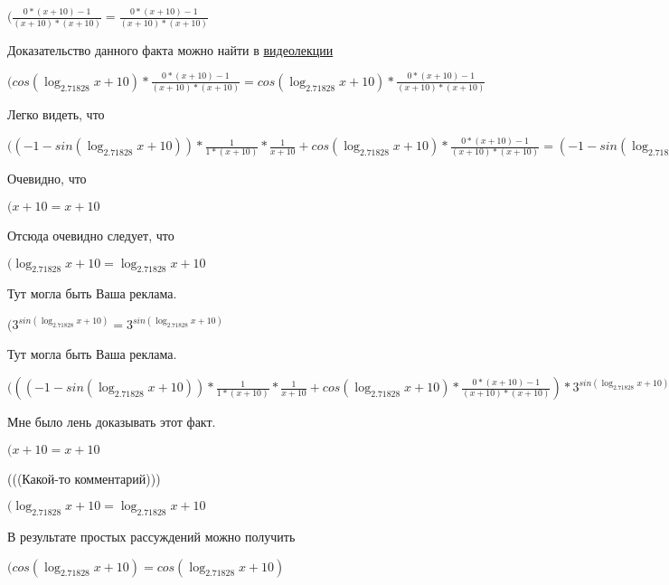\documentclass[12pt,a4paper,fleqn]{article}
\theoremstyle{definition}
\begin{document}
$(\frac{ 0  * ( x  +  10 ) -  1 }{( x  +  10 ) * ( x  +  10 )}
 = \frac{ 0  * ( x  +  10 ) -  1 }{( x  +  10 ) * ( x  +  10 )}
$

Доказательство данного факта можно найти в \href{https://www.youtube.com/watch?v=dQw4w9WgXcQ}{видеолекции}

$(cos(\log_{ 2.71828 }{ x  +  10 }) * \frac{ 0  * ( x  +  10 ) -  1 }{( x  +  10 ) * ( x  +  10 )}
 = cos(\log_{ 2.71828 }{ x  +  10 }) * \frac{ 0  * ( x  +  10 ) -  1 }{( x  +  10 ) * ( x  +  10 )}
$

Легко видеть, что

$(( -1  - sin(\log_{ 2.71828 }{ x  +  10 })) * \frac{ 1 }{ 1  * ( x  +  10 )}
 * \frac{ 1 }{ x  +  10 }
 + cos(\log_{ 2.71828 }{ x  +  10 }) * \frac{ 0  * ( x  +  10 ) -  1 }{( x  +  10 ) * ( x  +  10 )}
 = ( -1  - sin(\log_{ 2.71828 }{ x  +  10 })) * \frac{ 1 }{ 1  * ( x  +  10 )}
 * \frac{ 1 }{ x  +  10 }
 + cos(\log_{ 2.71828 }{ x  +  10 }) * \frac{ 0  * ( x  +  10 ) -  1 }{( x  +  10 ) * ( x  +  10 )}
$

Очевидно, что

$( x  +  10  =  x  +  10 $

Отсюда очевидно следует, что

$(\log_{ 2.71828 }{ x  +  10 } = \log_{ 2.71828 }{ x  +  10 }$

Тут могла быть Ваша реклама.

$({ 3 }^{sin(\log_{ 2.71828 }{ x  +  10 })} = { 3 }^{sin(\log_{ 2.71828 }{ x  +  10 })}$

Тут могла быть Ваша реклама.

$((( -1  - sin(\log_{ 2.71828 }{ x  +  10 })) * \frac{ 1 }{ 1  * ( x  +  10 )}
 * \frac{ 1 }{ x  +  10 }
 + cos(\log_{ 2.71828 }{ x  +  10 }) * \frac{ 0  * ( x  +  10 ) -  1 }{( x  +  10 ) * ( x  +  10 )}
) * { 3 }^{sin(\log_{ 2.71828 }{ x  +  10 })} = (( -1  - sin(\log_{ 2.71828 }{ x  +  10 })) * \frac{ 1 }{ 1  * ( x  +  10 )}
 * \frac{ 1 }{ x  +  10 }
 + cos(\log_{ 2.71828 }{ x  +  10 }) * \frac{ 0  * ( x  +  10 ) -  1 }{( x  +  10 ) * ( x  +  10 )}
) * { 3 }^{sin(\log_{ 2.71828 }{ x  +  10 })}$

Мне было лень доказывать этот факт.

$( x  +  10  =  x  +  10 $

(((Какой-то комментарий)))

$(\log_{ 2.71828 }{ x  +  10 } = \log_{ 2.71828 }{ x  +  10 }$

В результате простых рассуждений можно получить

$(cos(\log_{ 2.71828 }{ x  +  10 }) = cos(\log_{ 2.71828 }{ x  +  10 })$
\end{document}
